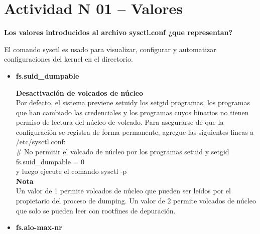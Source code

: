 \section{Actividad N 01 – Valores} 
\textbf{Los valores introducidos al archivo sysctl.conf ¿que representan?}

\begin{flushleft}
El comando sysctl es usado para visualizar, configurar y automatizar configuraciones del kernel en el directorio.
\end{flushleft}

\begin{itemize}
	\item \textbf{fs.suid\_dumpable}

	\begin{flushleft}
	\textbf{Desactivación de volcados de núcleo}\\
Por defecto, el sistema previene setuidy los setgid programas, los programas que han cambiado las credenciales y los programas cuyos binarios no tienen permiso de lectura del núcleo de volcado. Para asegurarse de que la configuración se registra de forma permanente, agregue las siguientes líneas a /etc/sysctl.conf:\\
\vspace{5mm} %
	\# No permitir el volcado de núcleo por los programas setuid y setgid\\
	fs.suid\_dumpable = 0\\
\vspace{5mm}
	y luego ejecute el comando sysctl -p\\
\vspace{5mm} %
\textbf{Nota}\\
Un valor de 1 permite volcados de núcleo que pueden ser leídos por el propietario del proceso de dumping. Un valor de 2 permite volcados de núcleo que solo se pueden leer con rootfines de depuración.
	\end{flushleft}

	\item \textbf{fs.aio-max-nr}


\end{itemize}

